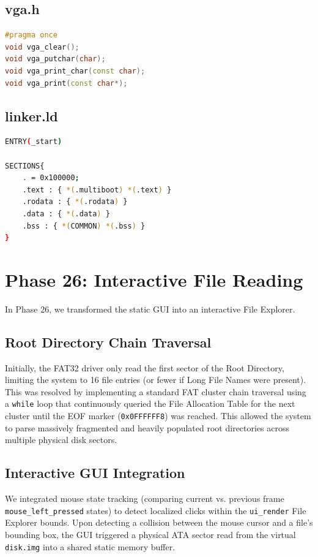 \documentclass[12pt,a4paper]{report}
\begin{document}
\subsection{vga.h}
\begin{lstlisting}[language={C++}]
#pragma once
void vga_clear();
void vga_putchar(char);
void vga_print_char(const char);
void vga_print(const char*);
\end{lstlisting}

\subsection{linker.ld}
\begin{lstlisting}[language={bash}]
ENTRY(_start)

SECTIONS{
    . = 0x100000;
    .text : { *(.multiboot) *(.text) }
    .rodata : { *(.rodata) }
    .data : { *(.data) }
    .bss : { *(COMMON) *(.bss) }
}
\end{lstlisting}


\section{Phase 26: Interactive File Reading}
In Phase 26, we transformed the static GUI into an interactive File Explorer. 

\subsection{Root Directory Chain Traversal}
Initially, the FAT32 driver only read the first sector of the Root Directory, limiting the system to 16 file entries (or fewer if Long File Names were present). This was resolved by implementing a standard FAT cluster chain traversal using a \texttt{while} loop that continuously queried the File Allocation Table for the next cluster until the EOF marker (\texttt{0x0FFFFFF8}) was reached. This allowed the system to parse massively fragmented and heavily populated root directories across multiple physical disk sectors.

\subsection{Interactive GUI Integration}
We integrated mouse state tracking (comparing current vs. previous frame \texttt{mouse\_left\_pressed} states) to detect localized clicks within the \texttt{ui\_render} File Explorer bounds. Upon detecting a collision between the mouse cursor and a file's bounding box, the GUI triggered a physical ATA sector read from the virtual \texttt{disk.img} into a shared static memory buffer. 
\end{document}
